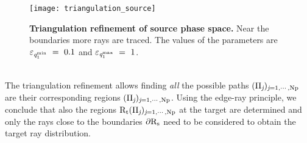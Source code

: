 \begin{figure}[h]
  \begin{center}
  \texttt{[image: triangulation\_source]}
  \end{center}
  \caption{\textbf{Triangulation refinement of source phase space.} 
Near the boundaries more rays are traced.
    The values of the parameters are $\varepsilon_{\textit{q}_1^\textrm{min}}~=~ 0.1$ and $\varepsilon_{\textit{q}_1^\textrm{max}}~=~1$.}
   \label{fig:triangulation_refinement}
  \end{figure}
\\ \indent The triangulation refinement allows finding \textit{all} the possible paths $(\Pi_{\textit{j}})_{\textit{j} = 1, \cdots, \textrm{Np}}$ are their corresponding regions $(\Pi_{\textit{j}})_{\textit{j} = 1, \cdots, \textrm{Np}}$. Using the edge-ray principle, we conclude that also the regions $\mbox{$\textup{R}$}_\textrm{t}(\Pi_{\textit{j}})_{\textit{j} = 1, \cdots, \textrm{Np}}$ at the target are determined and only the rays close to the boundaries
$\partial\mbox{$\textup{R}$}_\textrm{s}$ need to be considered to obtain the target ray distribution.
